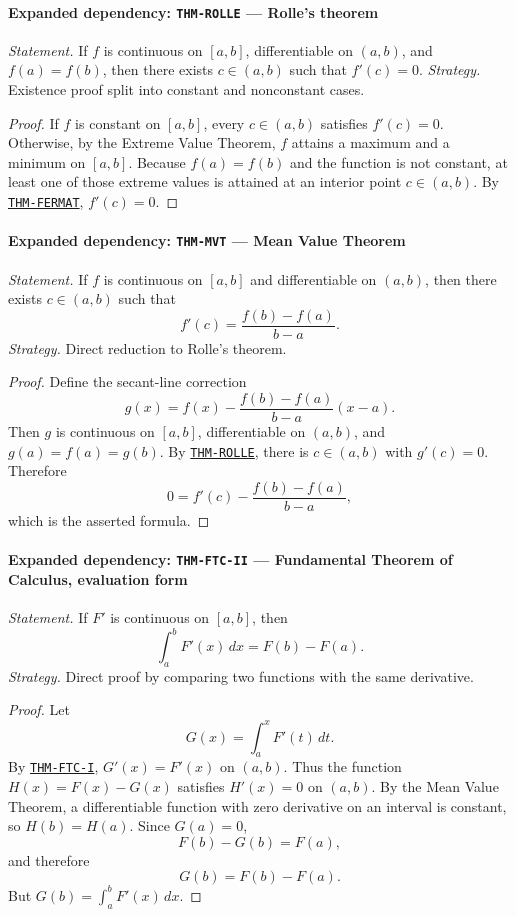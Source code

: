 \documentclass[10pt]{article}
\newcommand{\pidraw}[1]{\begingroup\urlstyle{tt}\nolinkurl{#1}\endgroup}
\newcommand{\pidref}[1]{\hyperref[prf:#1]{\pidraw{#1}}}
\newcommand{\pid}[1]{\pidref{#1}}
\theoremstyle{definition}
\theoremstyle{remark}
\begin{document}
\paragraph{Expanded dependency: \pidraw{THM-ROLLE} --- Rolle's theorem}
\textit{Statement.} If $f$ is continuous on $[a,b]$, differentiable on $(a,b)$, and $f(a)=f(b)$, then there exists $c\in(a,b)$ such that $f'(c)=0$.
\textit{Strategy.} Existence proof split into constant and nonconstant cases.
\begin{proof}If $f$ is constant on $[a,b]$, every $c\in(a,b)$ satisfies $f'(c)=0$.
Otherwise, by the Extreme Value Theorem, $f$ attains a maximum and a minimum
on $[a,b]$. Because $f(a)=f(b)$ and the function is not constant, at least one
of those extreme values is attained at an interior point $c\in(a,b)$.
By \pid{THM-FERMAT}, $f'(c)=0$.\end{proof}

\paragraph{Expanded dependency: \pidraw{THM-MVT} --- Mean Value Theorem}
\textit{Statement.} If $f$ is continuous on $[a,b]$ and differentiable on $(a,b)$, then there exists $c\in(a,b)$ such that
\[
f'(c)=\frac{f(b)-f(a)}{b-a}.
\]
\textit{Strategy.} Direct reduction to Rolle's theorem.
\begin{proof}Define the secant-line correction
\[
g(x)=f(x)-\frac{f(b)-f(a)}{b-a}(x-a).
\]
Then $g$ is continuous on $[a,b]$, differentiable on $(a,b)$, and
$g(a)=f(a)=g(b)$. By \pid{THM-ROLLE}, there is $c\in(a,b)$ with $g'(c)=0$.
Therefore
\[
0=f'(c)-\frac{f(b)-f(a)}{b-a},
\]
which is the asserted formula.\end{proof}

\paragraph{Expanded dependency: \pidraw{THM-FTC-II} --- Fundamental Theorem of Calculus, evaluation form}
\textit{Statement.} If $F'$ is continuous on $[a,b]$, then
\[
\int_a^b F'(x)\,dx=F(b)-F(a).
\]
\textit{Strategy.} Direct proof by comparing two functions with the same derivative.
\begin{proof}Let
\[
G(x)=\int_a^x F'(t)\,dt.
\]
By \pid{THM-FTC-I}, $G'(x)=F'(x)$ on $(a,b)$. Thus the function
$H(x)=F(x)-G(x)$ satisfies $H'(x)=0$ on $(a,b)$. By the Mean Value Theorem,
a differentiable function with zero derivative on an interval is constant, so
$H(b)=H(a)$. Since $G(a)=0$,
\[
F(b)-G(b)=F(a),
\]
and therefore
\[
G(b)=F(b)-F(a).
\]
But $G(b)=\int_a^b F'(x)\,dx$.\end{proof}
\end{document}
